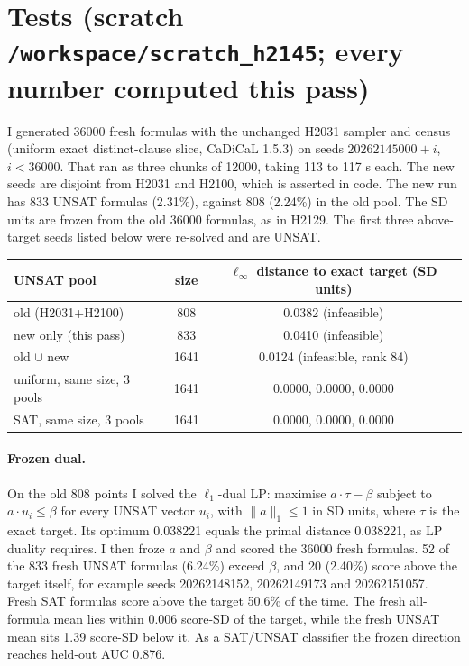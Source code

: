 \documentclass[11pt]{article}
\begin{document}
\section*{Tests (scratch \texttt{/workspace/scratch\_h2145}; every number computed this pass)}
I generated 36000 fresh formulas with the unchanged H2031 sampler and census (uniform exact distinct-clause slice, CaDiCaL 1.5.3) on seeds $20262145000+i$, $i<36000$. That ran as three chunks of 12000, taking 113 to 117 s each. The new seeds are disjoint from H2031 and H2100, which is asserted in code. The new run has 833 UNSAT formulas (2.31\%), against 808 (2.24\%) in the old pool. The SD units are frozen from the old 36000 formulas, as in H2129. The first three above-target seeds listed below were re-solved and are UNSAT.

\begin{center}\begin{tabular}{lcc}\toprule
UNSAT pool & size & $\ell_\infty$ distance to exact target (SD units)\\\midrule
old (H2031+H2100) & 808 & 0.0382 (infeasible)\\
new only (this pass) & 833 & 0.0410 (infeasible)\\
old $\cup$ new & 1641 & 0.0124 (infeasible, rank 84)\\
uniform, same size, 3 pools & 1641 & 0.0000, 0.0000, 0.0000\\
SAT, same size, 3 pools & 1641 & 0.0000, 0.0000, 0.0000\\\bottomrule
\end{tabular}\end{center}

\paragraph{Frozen dual.} On the old 808 points I solved the $\ell_1$-dual LP: maximise $a\cdot\tau-\beta$ subject to $a\cdot u_i\le\beta$ for every UNSAT vector $u_i$, with $\|a\|_1\le1$ in SD units, where $\tau$ is the exact target. Its optimum 0.038221 equals the primal distance 0.038221, as LP duality requires. I then froze $a$ and $\beta$ and scored the 36000 fresh formulas. 52 of the 833 fresh UNSAT formulas (6.24\%) exceed $\beta$, and 20 (2.40\%) score above the target itself, for example seeds 20262148152, 20262149173 and 20262151057. Fresh SAT formulas score above the target 50.6\% of the time. The fresh all-formula mean lies within 0.006 score-SD of the target, while the fresh UNSAT mean sits 1.39 score-SD below it. As a SAT/UNSAT classifier the frozen direction reaches held-out AUC 0.876.
\end{document}
